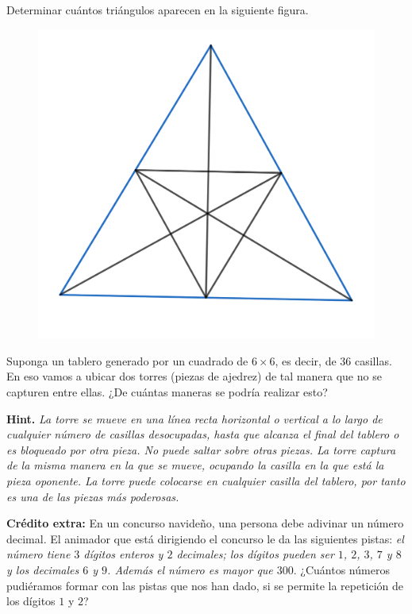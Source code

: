 \documentclass[12pt]{article}
\begin{document}
\begin{problema}
Determinar cuántos triángulos aparecen en la siguiente figura.
\begin{figure}[h!]
    \centering
    \includegraphics[scale=0.2]{Imagenes/IMG1/img_corto2.png}
\end{figure}
\end{problema}

\begin{problema}
Suponga un tablero generado por un cuadrado de $6\times 6$, es decir, de $36$ casillas. En eso vamos a ubicar dos torres (piezas de ajedrez) de tal manera que no se capturen entre ellas. ¿De cuántas maneras se podría realizar esto?

{\small \textbf{Hint.} \textit{La torre se mueve en una línea recta horizontal o vertical a lo largo de cualquier número de casillas desocupadas, hasta que alcanza el final del tablero o es bloqueado por otra pieza. No puede saltar sobre otras piezas. La torre captura de la misma manera en la que se mueve, ocupando la casilla en la que está la pieza oponente. La torre puede colocarse en cualquier casilla del tablero, por tanto es una de las piezas más poderosas.}}
\end{problema}

\textbf{Crédito extra:} En un concurso navideño, una persona debe adivinar un número decimal. El animador que está dirigiendo el concurso le da las siguientes pistas: \textit{el número tiene $3$ dígitos enteros y $2$ decimales; los dígitos pueden ser $1$, $2$, $3$, $7$ y $8$ y los decimales $6$ y $9$. Además el número es mayor que $300$}. ¿Cuántos números pudiéramos formar con las pistas que nos han dado, si se permite la repetición de los dígitos $1$ y $2$? 
\end{document}
